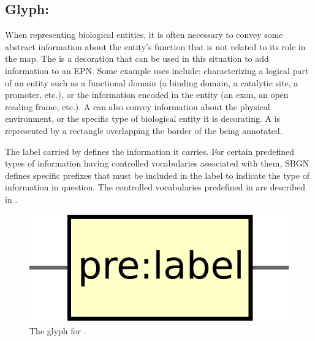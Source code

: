 \subsection{Glyph: }
\label{sec:unitInfo}

When representing biological entities, it is often necessary to convey some abstract information about the entity's function that is not related to its role in the map.  The  is a decoration that can be used in this situation to add information to an EPN.  Some example uses include: characterizing a logical part of an entity such as a functional domain (a binding domain, a catalytic site, a promoter, etc.), or the information encoded in the entity (an exon, an open reading frame, etc.).  A  can also convey information about the physical environment, or the specific type of biological entity it is decorating. A  is represented by a rectangle overlapping the border of the  being annotated.

The label carried by  defines the information it carries.  For certain predefined types of information having controlled vocabularies associated with them, SBGN defines specific prefixes that must be included in the label to indicate the type of information in question.  The controlled vocabularies predefined in \SBGNPDLone are described in .

\begin{figure}[H]
  \centering
  \includegraphics[scale = 0.3]{images/unitInformation}
  \caption{The \PD glyph for .}
  \label{fig:unitInfo}
\end{figure}






